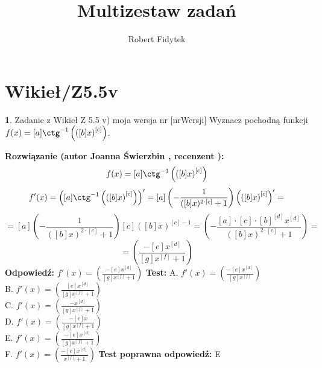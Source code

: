 \documentclass[12pt, a4paper]{article}
\title{Multizestaw zadań}
\author{Robert Fidytek}
\date{}
\theoremstyle{definition} %
\newtheorem{zad}{}
\newcommand{\kategoria}[1]{\section{#1}} %
\newcommand{\zadStart}[1]{\begin{zad}#1\newline} %
\newcommand{\zadStop}{\end{zad}}   %
\newcommand{\rozwStart}[2]{\noindent \textbf{Rozwiązanie (autor #1 , recenzent #2): }\newline} %
\newcommand{\rozwStop}{\newline}                                            %
\newcommand{\odpStart}{\noindent \textbf{Odpowiedź:}\newline}    %
\newcommand{\odpStop}{\newline}                                             %
\newcommand{\testStart}{\noindent \textbf{Test:}\newline} %
\newcommand{\testStop}{\newline} %
\newcommand{\kluczStart}{\noindent \textbf{Test poprawna odpowiedź:}\newline} %
\newcommand{\kluczStop}{\newline} %
\begin{document}
\maketitle


\kategoria{Wikieł/Z5.5v}
\zadStart{Zadanie z Wikieł Z 5.5 v) moja wersja nr [nrWersji]}
Wyznacz pochodną funkcji \\ $f(x)=[a] \ctg^{-1}\left(\left([b]x\right)^{[c]}\right)$.
\zadStop
\rozwStart{Joanna Świerzbin}{}
$$f(x)=[a] \ctg^{-1}\left(\left([b]x\right)^{[c]}\right)$$
$$f'(x)= \left( [a] \ctg^{-1} \left(\left([b]x\right)^{[c]}\right) \right)' = [a] \left( -\frac{1}{([b]x)^{2\cdot [c]}+1} \right)\left(\left([b]x\right)^{[c]}\right)'= $$
$$= [a] \left( -\frac{1}{([b]x)^{2\cdot [c]}+1} \right) [c] \left( [b]x \right)^{[c]-1}=\left( -\frac{[a]\cdot[c]\cdot[b]^{[d]}x^{[d]}}{([b]x)^{2\cdot [c]}+1} \right) =$$
$$ =\left( \frac{- [e] x^{[d]}}{[g]x^{[f]}+1} \right) $$
\rozwStop
\odpStart
$ f'(x) = \left( \frac{- [e] x^{[d]}}{[g]x^{[f]}+1} \right) $
\odpStop
\testStart
A. $ f'(x) = \left( \frac{- [e] x^{[d]}}{[g]x^{[f]}} \right) $\\
B. $ f'(x) = \left( \frac{ [e] x^{[d]}}{[g]x^{[f]}+1} \right) $\\
C. $ f'(x) = \left( \frac{- x^{[d]}}{[g]x^{[f]}+1} \right) $\\
D. $ f'(x) = \left( \frac{- [e] x}{[g]x^{[f]}+1} \right) $\\
E. $ f'(x) = \left( \frac{- [e] x^{[d]}}{[g]x^{[f]}+1} \right) $\\
F. $ f'(x) = \left( \frac{- [e] x^{[d]}}{x^{[f]}+1} \right) $
\testStop
\kluczStart
E
\kluczStop
\end{document}
